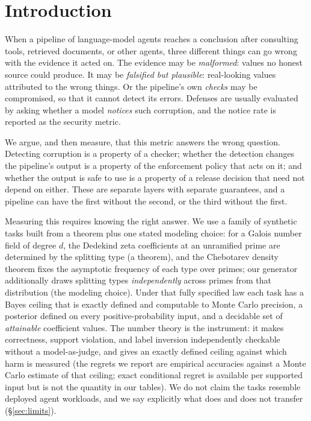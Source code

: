 \documentclass[conference]{IEEEtran}
\begin{document}
\section{Introduction}

When a pipeline of language-model agents reaches a conclusion after
consulting tools, retrieved documents, or other agents, three
different things can go wrong with the evidence it acted on. The
evidence may be \emph{malformed}: values no honest source could
produce. It may be \emph{falsified but plausible}: real-looking values
attributed to the wrong things. Or the pipeline's own \emph{checks}
may be compromised, so that it cannot detect its errors. Defenses are
usually evaluated by asking whether a model \emph{notices} such
corruption, and the notice rate is reported as the security metric.

We argue, and then measure, that this metric answers the wrong
question. Detecting corruption is a property of a checker; whether the
detection changes the pipeline's output is a property of the
enforcement policy that acts on it; and whether the output is safe to
use is a property of a release decision that need not depend on
either. These are separate layers with separate guarantees, and a
pipeline can have the first without the second, or the third without
the first.

Measuring this requires knowing the right answer. We use a family of
synthetic tasks built from a theorem plus one stated modeling choice:
for a Galois number field of degree $d$, the Dedekind zeta coefficients
at an unramified prime are determined by the splitting type (a
theorem), and the Chebotarev density theorem fixes the asymptotic
frequency of each type over primes; our generator additionally draws
splitting types \emph{independently} across primes from that
distribution (the modeling choice). Under that fully specified law
each task has a Bayes ceiling that is exactly defined and computable
to Monte Carlo precision, a posterior defined on every
positive-probability input, and a decidable set of \emph{attainable}
coefficient values. The number theory is the instrument: it makes
correctness, support violation, and label inversion independently
checkable without a model-as-judge, and gives an exactly defined
ceiling against which harm is measured (the regrets we report are
empirical accuracies against a Monte Carlo estimate of that ceiling;
exact conditional regret is available per supported input but is not
the quantity in our tables). We do not claim the tasks resemble
deployed agent workloads, and we say explicitly what does and does not
transfer (\S\ref{sec:limits}).
\end{document}
